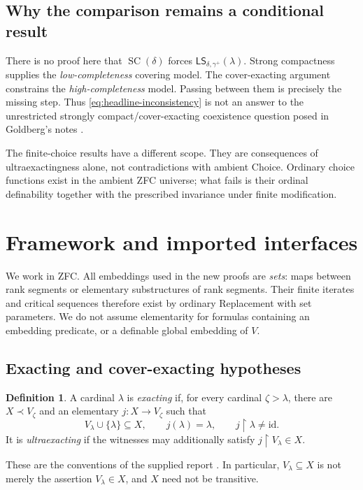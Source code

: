 \documentclass[11pt,letterpaper]{article}
\theoremstyle{definition}
\newtheorem{definition}{Definition}[section]
\newcommand{\SC}{\operatorname{SC}}
\newcommand{\id}{\mathrm{id}}
\newcommand{\restr}{\mathbin{\upharpoonright}}
\newcommand{\LS}{\mathsf{LS}}
\begin{document}
\subsection{Why the comparison remains a conditional result}

There is no proof here that $\SC(\delta)$ forces $\LS_{\delta,\gamma^+}(\lambda)$. Strong compactness supplies the \emph{low-completeness} covering model. The cover-exacting argument constrains the \emph{high-completeness} model. Passing between them is precisely the missing step. Thus \eqref{eq:headline-inconsistency} is not an answer to the unrestricted strongly compact/cover-exacting coexistence question posed in Goldberg's notes \cite[Problem 5.2]{cover}.

The finite-choice results have a different scope. They are consequences of ultraexactingness alone, not contradictions with ambient Choice. Ordinary choice functions exist in the ambient ZFC universe; what fails is their ordinal definability together with the prescribed invariance under finite modification.

\section{Framework and imported interfaces}\label{sec:framework}

We work in ZFC. All embeddings used in the new proofs are \emph{sets}: maps between rank segments or elementary substructures of rank segments. Their finite iterates and critical sequences therefore exist by ordinary Replacement with set parameters. We do not assume elementarity for formulas containing an embedding predicate, or a definable global embedding of $V$.

\subsection{Exacting and cover-exacting hypotheses}

\begin{definition}\label{def:exacting}
A cardinal $\lambda$ is \emph{exacting} if, for every cardinal $\zeta>\lambda$, there are $X\prec V_\zeta$ and an elementary $j:X\to V_\zeta$ such that
\[
 V_\lambda\cup\{\lambda\}\subseteq X,
 \qquad j(\lambda)=\lambda,
 \qquad j\restr\lambda\neq\id.
\]
It is \emph{ultraexacting} if the witnesses may additionally satisfy $j\restr V_\lambda\in X$.
\end{definition}

These are the conventions of the supplied report \cite{unified}. In particular, $V_\lambda\subseteq X$ is not merely the assertion $V_\lambda\in X$, and $X$ need not be transitive.
\end{document}
